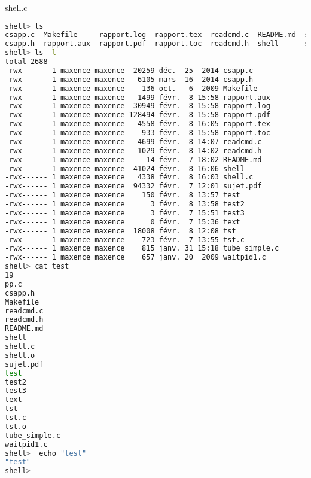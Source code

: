 \documentclass{report}
\begin{document}
		shell.c
		\begin{lstlisting}[frame=single,basicstyle=\footnotesize,language=bash]
shell> ls
csapp.c  Makefile     rapport.log  rapport.tex	readcmd.c  README.md  shell.c	 test	test3  tst    tube_simple.c
csapp.h  rapport.aux  rapport.pdf  rapport.toc	readcmd.h  shell      sujet.pdf  test2	text   tst.c  waitpid1.c
shell> ls -l
total 2688
-rwx------ 1 maxence maxence  20259 déc.  25  2014 csapp.c
-rwx------ 1 maxence maxence   6105 mars  16  2014 csapp.h
-rwx------ 1 maxence maxence    136 oct.   6  2009 Makefile
-rwx------ 1 maxence maxence   1499 févr.  8 15:58 rapport.aux
-rwx------ 1 maxence maxence  30949 févr.  8 15:58 rapport.log
-rwx------ 1 maxence maxence 128494 févr.  8 15:58 rapport.pdf
-rwx------ 1 maxence maxence   4558 févr.  8 16:05 rapport.tex
-rwx------ 1 maxence maxence    933 févr.  8 15:58 rapport.toc
-rwx------ 1 maxence maxence   4699 févr.  8 14:07 readcmd.c
-rwx------ 1 maxence maxence   1029 févr.  8 14:02 readcmd.h
-rwx------ 1 maxence maxence     14 févr.  7 18:02 README.md
-rwx------ 1 maxence maxence  41024 févr.  8 16:06 shell
-rwx------ 1 maxence maxence   4338 févr.  8 16:03 shell.c
-rwx------ 1 maxence maxence  94332 févr.  7 12:01 sujet.pdf
-rwx------ 1 maxence maxence    150 févr.  8 13:57 test
-rwx------ 1 maxence maxence      3 févr.  8 13:58 test2
-rwx------ 1 maxence maxence      3 févr.  7 15:51 test3
-rwx------ 1 maxence maxence      0 févr.  7 15:36 text
-rwx------ 1 maxence maxence  18008 févr.  8 12:08 tst
-rwx------ 1 maxence maxence    723 févr.  7 13:55 tst.c
-rwx------ 1 maxence maxence    815 janv. 31 15:18 tube_simple.c
-rwx------ 1 maxence maxence    657 janv. 20  2009 waitpid1.c
shell> cat test
19
pp.c
csapp.h
Makefile
readcmd.c
readcmd.h
README.md
shell
shell.c
shell.o
sujet.pdf
test
test2
test3
text
tst
tst.c
tst.o
tube_simple.c
waitpid1.c
shell>  echo "test"
"test"
shell>
		\end{lstlisting}
\end{document}
